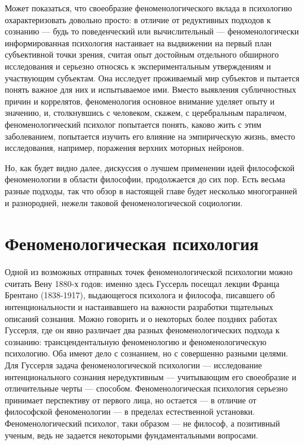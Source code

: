 \documentclass[11pt]{book}
\begin{document}
Может показаться, что своеобразие феноменологического вклада в психологию охарактеризовать довольно просто: в отличие от редуктивных подходов к сознанию --- будь то поведенческий или вычислительный --- феноменологически информированная психология настаивает на выдвижении на первый план субъективной точки зрения, считая опыт достойным отдельного обширного исследования и серьезно относясь к экспериментальным утверждениям и участвующим субъектам. Она исследует проживаемый мир субъектов и пытается понять важное для них и испытываемое ими. Вместо выявления субличностных причин и коррелятов, феноменология основное внимание уделяет опыту и значению, и, столкнувшись с человеком, скажем, с церебральным параличом, феноменологический психолог попытается понять, каково жить с этим заболеванием, попытается изучить его влияние на эмпирическую жизнь, вместо исследования, например, поражения верхних моторных нейронов.

Но, как будет видно далее, дискуссия о лучшем применении идей философской феноменологии в области философии, продолжается до сих пор. Есть весьма разные подходы, так что обзор в настоящей главе будет несколько многогранней и разнородней, нежели таковой феноменологической социологии.

\section{Феноменологическая психология}

Одной из возможных отправных точек феноменологической психологии можно считать Вену 1880-х годов: именно здесь Гуссерль посещал лекции Франца Брентано (1838-1917), выдающегося психолога и философа, писавшего об интенциональности и настаивавшего на важности разработки тщательных описаний сознания. Можно говорить и о некоторых более поздних работах Гуссерля, где он явно различает два разных феноменологических подхода к сознанию: трансцендентальную феноменологию и феноменологическую психологию. Оба имеют дело с сознанием, но с совершенно разными целями. Для Гуссерля задача феноменологической психологии --- исследование интенционального сознания нередуктивным --- учитывающим его своеобразие и отличительные черты --- способом. Феноменологическая психология серьезно принимает перспективу от первого лица, но остается --- в отличие от философской феноменологии --- в пределах естественной установки. Феноменологический психолог, таки образом --- не философ, а позитивный ученым, ведь не задается некоторыми фундаментальными вопросами.
\end{document}
